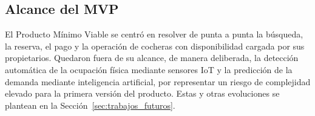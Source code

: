 \subsection{Alcance del MVP}

El Producto Mínimo Viable se centró en resolver de punta a punta la búsqueda, la reserva, el pago y la operación de cocheras con disponibilidad cargada por sus propietarios. Quedaron fuera de su alcance, de manera deliberada, la detección automática de la ocupación física mediante sensores IoT y la predicción de la demanda mediante inteligencia artificial, por representar un riesgo de complejidad elevado para la primera versión del producto. Estas y otras evoluciones se plantean en la Sección~\ref{sec:trabajos_futuros}.
